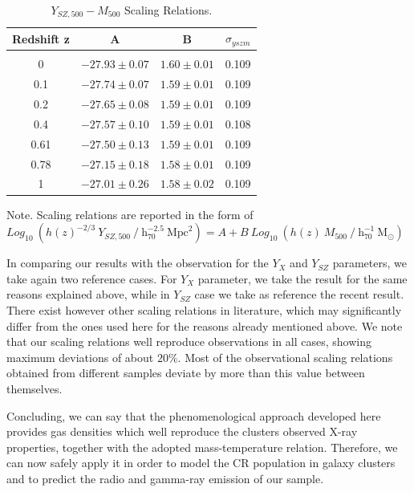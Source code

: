 \documentclass[traditabstract]{aa}
\newcommand{\rmn}{\mathrm}
\begin{document}
\begin{table}[hbt!]
\begin{center}
\caption{$Y_{SZ, 500}-M_{500}$ Scaling Relations.}
\medskip
\begin{tabular}{cccc}
\hline
\phantom{\Big|}
Redshift z & A & B & $\sigma_{yszm}$ \\
\hline\\[-0.5em]
 0      & $-27.93\pm0.07$ & $1.60\pm0.01$ & 0.109\\
 0.1   & $-27.74\pm0.07$ & $1.59\pm0.01$ & 0.109\\
 0.2   & $-27.65\pm0.08$ & $1.59\pm0.01$ & 0.109\\ 
 0.4   & $-27.57\pm0.10$ & $1.59\pm0.01$ & 0.108\\ 
 0.61 & $-27.50\pm0.13$ & $1.59\pm0.01$ & 0.109\\ 
 0.78 & $-27.15\pm0.18$ & $1.58\pm0.01$ & 0.109\\ 
 1      & $-27.01\pm0.26$ & $1.58\pm0.02$ & 0.109\\[0.5em] 
\hline
\end{tabular}
\label{tab:YSZfits}
\end{center}
\footnotesize{Note. Scaling relations are reported in the form of $Log_{10}~(h(z)^{-2/3}~Y_{SZ,500}~/~\rmn{h}_{70}^{-2.5}~\rmn{Mpc}^{2})=A+B~Log_{10}~(h(z)~M_{500}~/~\rmn{h}_{70}^{-1}~\rmn{M_{\odot}})$}
\end{table}

In comparing our results with the observation for the $Y_X$ and $Y_{SZ}$ parameters, we take again two reference cases. For $Y_X$ parameter, we take the \cite{2010MNRAS.406.1773M} result for the same reasons explained above, while in $Y_{SZ}$ case we take as reference the recent \cite{2011A&A...536A..11P} result. There exist however other scaling relations in literature, which may significantly differ from the ones used here for the reasons already mentioned above. We note that our scaling relations well reproduce observations in all cases, showing maximum deviations of about $20\%$. Most of the observational scaling relations obtained from different samples deviate by more than this value between themselves.  

Concluding, we can say that the phenomenological approach developed here provides gas densities which well reproduce the clusters observed X-ray properties, together with the adopted mass-temperature relation. Therefore, we can now safely apply it in order to model the CR population in galaxy clusters and to predict the radio and gamma-ray emission of our sample.
\end{document}
